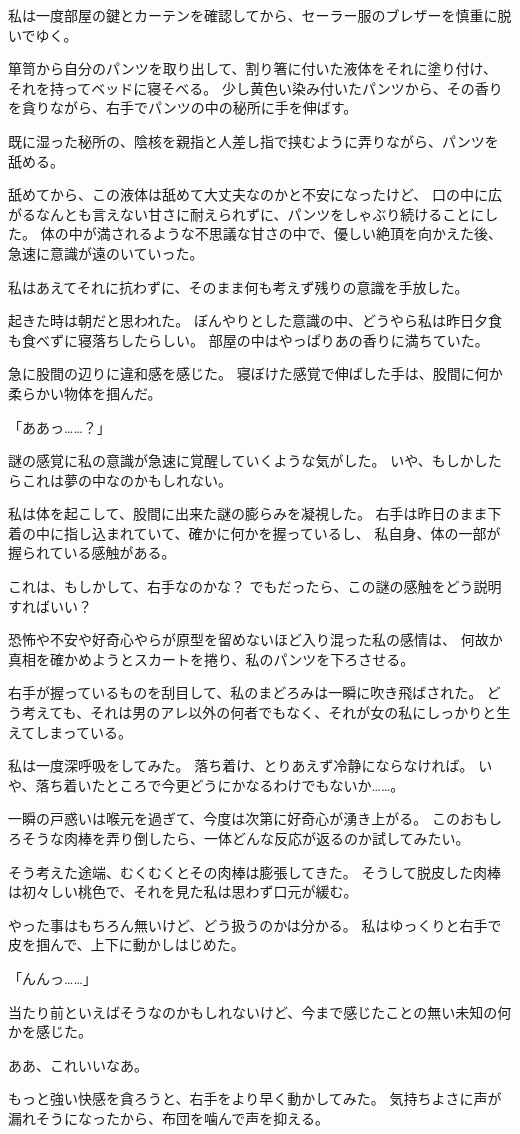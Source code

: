 私は一度部屋の鍵とカーテンを確認してから、セーラー服のブレザーを慎重に脱いでゆく。

箪笥から自分のパンツを取り出して、割り箸に付いた液体をそれに塗り付け、
それを持ってベッドに寝そべる。
少し黄色い染み付いたパンツから、その香りを貪りながら、右手でパンツの中の秘所に手を伸ばす。

既に湿った秘所の、陰核を親指と人差し指で挟むように弄りながら、パンツを舐める。

舐めてから、この液体は舐めて大丈夫なのかと不安になったけど、
口の中に広がるなんとも言えない甘さに耐えられずに、パンツをしゃぶり続けることにした。
体の中が満されるような不思議な甘さの中で、優しい絶頂を向かえた後、急速に意識が遠のいていった。

私はあえてそれに抗わずに、そのまま何も考えず残りの意識を手放した。


起きた時は朝だと思われた。
ぼんやりとした意識の中、どうやら私は昨日夕食も食べずに寝落ちしたらしい。
部屋の中はやっぱりあの香りに満ちていた。

急に股間の辺りに違和感を感じた。
寝ぼけた感覚で伸ばした手は、股間に何か柔らかい物体を掴んだ。

「ああっ……？」

謎の感覚に私の意識が急速に覚醒していくような気がした。
いや、もしかしたらこれは夢の中なのかもしれない。

私は体を起こして、股間に出来た謎の膨らみを凝視した。
右手は昨日のまま下着の中に指し込まれていて、確かに何かを握っているし、
私自身、体の一部が握られている感触がある。

これは、もしかして、右手なのかな？
でもだったら、この謎の感触をどう説明すればいい？

恐怖や不安や好奇心やらが原型を留めないほど入り混った私の感情は、
何故か真相を確かめようとスカートを捲り、私のパンツを下ろさせる。

右手が握っているものを刮目して、私のまどろみは一瞬に吹き飛ばされた。
どう考えても、それは男のアレ以外の何者でもなく、それが女の私にしっかりと生えてしまっている。

私は一度深呼吸をしてみた。
落ち着け、とりあえず冷静にならなければ。
いや、落ち着いたところで今更どうにかなるわけでもないか……。

一瞬の戸惑いは喉元を過ぎて、今度は次第に好奇心が湧き上がる。
このおもしろそうな肉棒を弄り倒したら、一体どんな反応が返るのか試してみたい。

そう考えた途端、むくむくとその肉棒は膨張してきた。
そうして脱皮した肉棒は初々しい桃色で、それを見た私は思わず口元が緩む。

やった事はもちろん無いけど、どう扱うのかは分かる。
私はゆっくりと右手で皮を掴んで、上下に動かしはじめた。

「んんっ……」

当たり前といえばそうなのかもしれないけど、今まで感じたことの無い未知の何かを感じた。

ああ、これいいなあ。

もっと強い快感を貪ろうと、右手をより早く動かしてみた。
気持ちよさに声が漏れそうになったから、布団を噛んで声を抑える。


